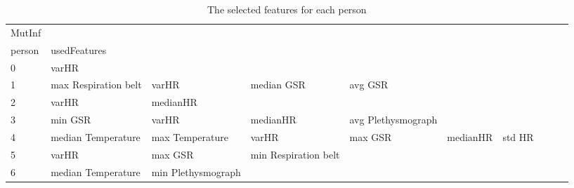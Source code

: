 \begin{landscape}
\begin{table}[]
\centering
\caption{The selected features for each person}
\begin{tabular}{l|llllllll}
MutInf   &                         &                       &                         &                         &                         &                       &                      &          &                      &        \\
person   & usedFeatures            &                       &                         &                         &                         &                       &                      &          &                      &        \\
0        & varHR                   &                       &                         &                         &                         &                       &                      &          &                      &        \\
1        & max Respiration belt    & varHR                 & median GSR              & avg GSR                 &                         &                       &                      &          &                      &        \\
2        & varHR                   & medianHR              &                         &                         &                         &                       &                      &          &                      &        \\
3        & min GSR                 & varHR                 & medianHR                & avg Plethysmograph      &                         &                       &                      &          &                      &        \\
4        & median Temperature      & max Temperature       & varHR                   & max GSR                 & medianHR                & std HR                &                      &          &                      &        \\
5        & varHR                   & max GSR               & min Respiration belt    &                         &                         &                       &                      &          &                      &        \\
6        & median Temperature      & min Plethysmograph    &                         &                         &                         &                       &                      &          &                      &        \\

\end{tabular}
\end{table}
\end{landscape}

